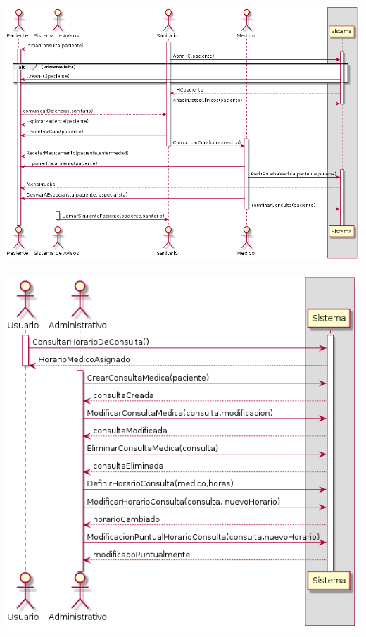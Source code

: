 \documentclass[10pt,a4paper,spanish]{report}
\begin{document}
\begin{center}

\includegraphics[scale=0.50]{Consulta.png}

\vspace{0.5cm}

\includegraphics[scale=0.50]{GestionDeConsultasMedicas.png}

\vspace{0.5cm}


\end{center}
\end{document}
